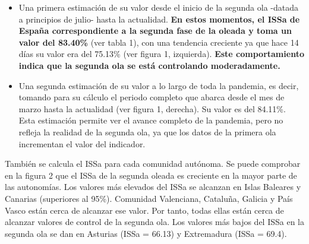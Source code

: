 \documentclass[
  11pt,
]{article}
\begin{document}
\begin{itemize}
\item
  Una primera estimación de su valor desde el inicio de la segunda ola
  -datada a principios de julio- hasta la actualidad. \textbf{En estos
  momentos, el ISSa de España correspondiente a la segunda fase de la
  oleada y toma un valor del 83.40\%} (ver tabla 1), con una tendencia
  creciente ya que hace 14 días su valor era del 75.13\% (ver figura 1,
  izquierda). \textbf{Este comportamiento indica que la segunda ola se
  está controlando moderadamente.}
\item
  Una segunda estimación de su valor a lo largo de toda la pandemia, es
  decir, tomando para su cálculo el periodo completo que abarca desde el
  mes de marzo hasta la actualidad (ver figura 1, derecha). Su valor es
  del 84.11\%. Esta estimación permite ver el avance completo de la
  pandemia, pero no refleja la realidad de la segunda ola, ya que los
  datos de la primera ola incrementan el valor del indicador.
\end{itemize}

También se calcula el ISSa para cada comunidad autónoma. Se puede
comprobar en la figura 2 que el ISSa de la segunda oleada es creciente
en la mayor parte de las autonomías. Los valores más elevados del ISSa
se alcanzan en Islas Baleares y Canarias (superiores al 95\%). Comunidad
Valenciana, Cataluña, Galicia y País Vasco están cerca de alcanzar ese
valor. Por tanto, todas ellas están cerca de alcanzar valores de control
de la segunda ola. Los valores más bajos del ISSa en la segunda ola se
dan en Asturias (ISSa = 66.13) y Extremadura (ISSa = 69.4).
\end{document}
